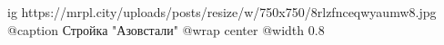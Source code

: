 
 
 
 
 

\ifcmt
  ig https://mrpl.city/uploads/posts/resize/w/750x750/8rlzfnceqwyaumw8.jpg
	@caption Стройка "Азовстали"
  @wrap center
  @width 0.8
\fi

